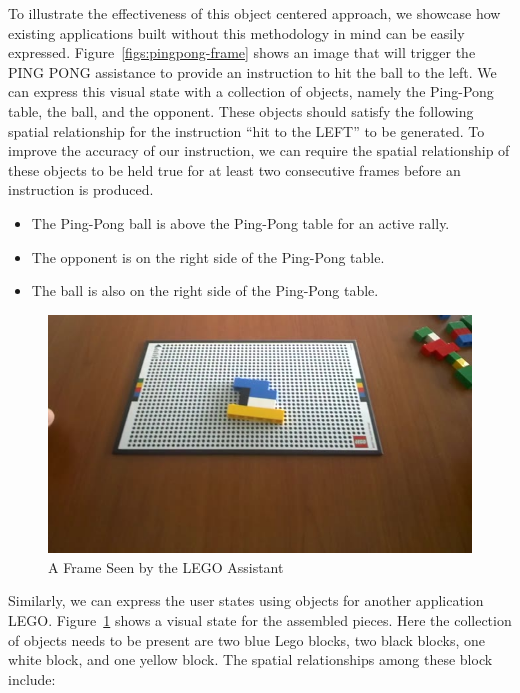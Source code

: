 To illustrate the effectiveness of this object centered approach, we showcase
how existing applications built without this methodology in mind can be easily
expressed. Figure~\ref{figs:pingpong-frame} shows an image that will trigger the
PING PONG assistance to provide an instruction to hit the ball to the left. We
can express this visual state with a collection of objects, namely the Ping-Pong
table, the ball, and the opponent. These objects should satisfy the following
spatial relationship for the instruction ``hit to the LEFT'' to be generated. To
improve the accuracy of our instruction, we can require the spatial relationship
of these objects to be held true for at least two consecutive frames before an
instruction is produced.

\begin{itemize}
  \item The Ping-Pong ball is above the Ping-Pong table for an active rally.
  \item The opponent is on the right side of the Ping-Pong table.
  \item The ball is also on the right side of the Ping-Pong table.
\end{itemize}

\begin{figure}
  \centering
  \includegraphics[trim={0 0 0 0},width=.9\linewidth]{FIGS/lego}
  \caption{A Frame Seen by the LEGO Assistant}
  \label{fig:lego-image}
\end{figure}

Similarly, we can express the user states using objects for another
application LEGO. Figure~\ref{fig:lego-image} shows a visual state for the
assembled pieces. Here the collection of objects needs to be present are two
blue Lego blocks, two black blocks, one white block, and one yellow block. The
spatial relationships among these block include:

